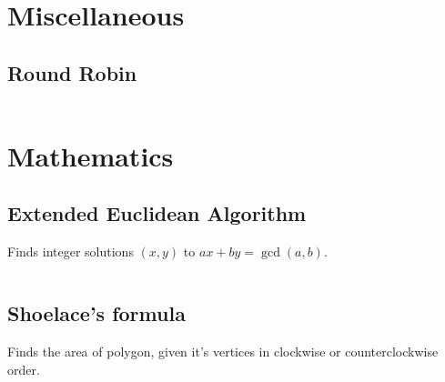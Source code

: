 \documentclass[8pt,a4paper,landscape,oneside]{amsart}
\newcommand{\code}[1]{\inputminted[fontsize=\normalsize,baselinestretch=1]{cpp}{_code/#1}}
\begin{document}
\begin{multicols*}{3}
	\code{graphs/2sat.cpp}

\section{Miscellaneous}

	\subsection{Round Robin}
	
	\code{miscellaneous/round_robin.cpp}

\section{Mathematics}

	\subsection{Extended Euclidean Algorithm}
	
	Finds integer solutions $(x, y)$ to $ax + by = \gcd(a, b)$.
	
	\code{math/extended_euclidean_algorithm.cpp}
	
	\subsection{Shoelace's formula}
	
	Finds the area of polygon, given it's vertices in clockwise or counterclockwise order.
	
	\code{math/geometry/shoelace.cpp}

\end{multicols*}
\end{document}
